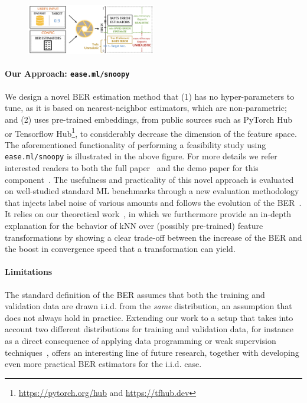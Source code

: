 \documentclass[11pt]{article}
\begin{document}
\begin{figure}
\vspace{-2em}
\centering
\includegraphics[width=0.5\textwidth]{submissions/data-quality-ml-ops/figs/snoopy.png}
\label{fig:snoopy}
\vspace{-2em}
\end{figure}

\paragraph{Our Approach: \texttt{ease.ml/snoopy}}
We design a novel BER estimation method that (1) has no hyper-parameters to tune, as it is based on nearest-neighbor estimators, which are non-parametric; and (2) uses pre-trained embeddings, from public sources such as PyTorch Hub or Tensorflow Hub\footnote{\url{https://pytorch.org/hub} and \url{https://tfhub.dev}}, to considerably decrease the dimension of the feature space. The aforementioned functionality of performing a feasibility study using \texttt{ease.ml/snoopy} is illustrated in the above figure. For more details we refer interested readers to both the full paper~\cite{renggli2020automatic} and the demo paper for this component~\cite{renggli2020ease}. The usefulness and practicality of this novel approach is evaluated on well-studied standard ML benchmarks through a new evaluation methodology that injects label noise of various amounts and follows the evolution of the BER~\cite{renggli2020automatic}. It relies on our theoretical work~\cite{rimanic2020convergence}, in which we furthermore provide an in-depth explanation for the behavior of kNN over (possibly pre-trained) feature transformations by showing a clear trade-off between the increase of the BER and the boost in convergence speed that a transformation can yield.


\paragraph{Limitations}
The standard definition of the BER assumes that both the training and validation data are drawn i.i.d. from the \textit{same} distribution, an assumption that does not always hold in practice.
Extending our work to a setup that takes into account two different distributions for training and validation data, for instance as a direct consequence of applying data programming or weak supervision techniques~\cite{ratner2017snorkel}, offers an interesting line of future research, together with developing even more practical 
BER estimators for the i.i.d. case.
\end{document}
